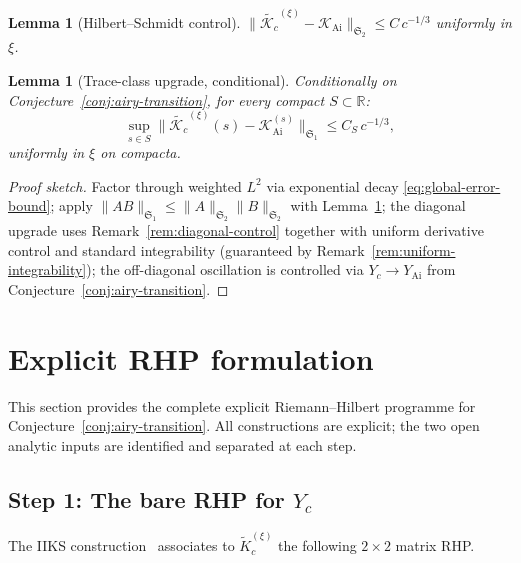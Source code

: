 \documentclass[12pt,a4paper]{amsart}
\newtheorem{lemma}[theorem]{Lemma}
\theoremstyle{definition}
\theoremstyle{remark}
\newcommand{\norm}[1]{\|#1\|}
\newcommand{\Kc}{\mathcal{K}_c}
\newcommand{\Kairy}{\mathcal{K}_{\mathrm{Ai}}}
\newcommand{\R}{\mathbb{R}}
\begin{document}
\begin{lemma}[Hilbert--Schmidt control]
\label{lem:hs}
$\norm{\widetilde{\Kc}^{(\xi)}-\Kairy}_{\mathfrak{S}_2}\le C\,c^{-1/3}$
uniformly in $\xi$.
\end{lemma}

\begin{lemma}[Trace-class upgrade, conditional]
\label{lem:trace-upgrade}
Conditionally on Conjecture~\ref{conj:airy-transition},
for every compact $S\subset\R$:
\begin{equation}\label{eq:trace-upgrade-bound}
  \sup_{s\in S}
  \norm{\widetilde{\Kc}^{(\xi)}(s)-\Kairy^{(s)}}_{\mathfrak{S}_1}
  \le C_S\,c^{-1/3},
\end{equation}
uniformly in $\xi$ on compacta.
\end{lemma}

\begin{proof}[Proof sketch]
Factor through weighted $L^2$ via exponential decay
\eqref{eq:global-error-bound}; apply
$\norm{AB}_{\mathfrak{S}_1}\le\norm{A}_{\mathfrak{S}_2}\norm{B}_{\mathfrak{S}_2}$
with Lemma~\ref{lem:hs}; the diagonal upgrade uses
Remark~\ref{rem:diagonal-control} together with uniform derivative
control and standard integrability
(guaranteed by Remark~\ref{rem:uniform-integrability});
the off-diagonal oscillation is controlled via $Y_c\to Y_{\mathrm{Ai}}$
from Conjecture~\ref{conj:airy-transition}.
\end{proof}

\section{Explicit RHP formulation}
\label{sec:rhp}

This section provides the complete explicit Riemann--Hilbert programme
for Conjecture~\ref{conj:airy-transition}.
All constructions are explicit; the two open analytic inputs
are identified and separated at each step.

\subsection{Step 1: The bare RHP for $Y_c$}

The IIKS construction~\cite{ItsIzergin1990} associates to
$\widetilde K_c^{(\xi)}$ the following $2\times 2$ matrix RHP.
\end{document}
